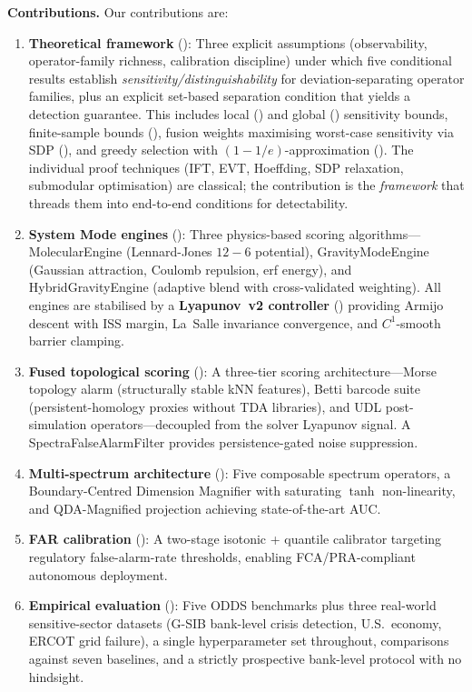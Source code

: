\documentclass{article}
\begin{document}
\textbf{Contributions.} Our contributions are:
\begin{enumerate}[leftmargin=*]
    \item \textbf{Theoretical framework} (): Three explicit assumptions (observability, operator-family richness, calibration discipline) under which five conditional results establish \emph{sensitivity/distinguishability} for deviation-separating operator families, plus an explicit set-based separation condition that yields a detection guarantee. This includes local () and global () sensitivity bounds, finite-sample bounds (), fusion weights maximising worst-case sensitivity via SDP (), and greedy selection with $(1-1/e)$-approximation (). The individual proof techniques (IFT, EVT, Hoeffding, SDP relaxation, submodular optimisation) are classical; the contribution is the \emph{framework} that threads them into end-to-end conditions for detectability.
    \item \textbf{System Mode engines} (): Three physics-based scoring algorithms---MolecularEngine (Lennard-Jones $12{-}6$ potential), GravityModeEngine (Gaussian attraction, Coulomb repulsion, erf energy), and HybridGravityEngine (adaptive blend with cross-validated weighting). All engines are stabilised by a \textbf{Lyapunov~v2 controller} () providing Armijo descent with ISS margin, La~Salle invariance convergence, and $C^1$-smooth barrier clamping.
    \item \textbf{Fused topological scoring} (): A three-tier scoring architecture---Morse topology alarm (structurally stable kNN features), Betti barcode suite (persistent-homology proxies without TDA libraries), and UDL post-simulation operators---decoupled from the solver Lyapunov signal. A SpectraFalseAlarmFilter provides persistence-gated noise suppression.
    \item \textbf{Multi-spectrum architecture} (): Five composable spectrum operators, a Boundary-Centred Dimension Magnifier with saturating $\tanh$ non-linearity, and QDA-Magnified projection achieving state-of-the-art AUC.
    \item \textbf{FAR calibration} (): A two-stage isotonic + quantile calibrator targeting regulatory false-alarm-rate thresholds, enabling FCA/PRA-compliant autonomous deployment.
    \item \textbf{Empirical evaluation} (): Five ODDS benchmarks plus three real-world sensitive-sector datasets (G-SIB bank-level crisis detection, U.S.\ economy, ERCOT grid failure), a single hyperparameter set throughout, comparisons against seven baselines, and a strictly prospective bank-level protocol with no hindsight.
\end{enumerate}
\end{document}
